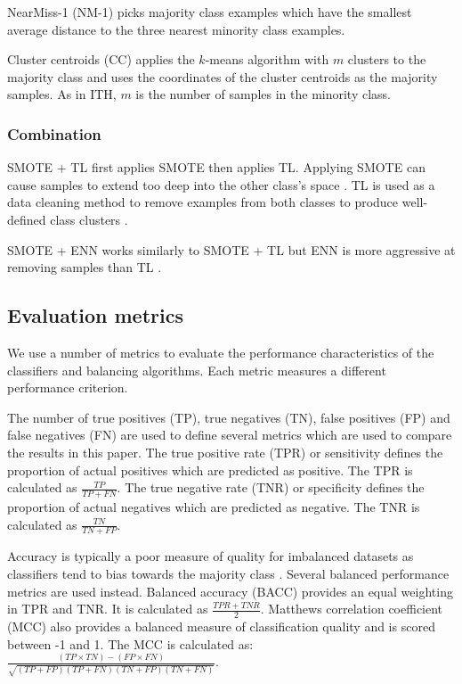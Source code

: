 \documentclass{sig-alternate-05-2015}
\begin{document}
	NearMiss-1 (NM-1) \cite{mani2003knn} picks majority class examples which have the smallest average distance to the three nearest minority class examples.
	
	Cluster centroids (CC) applies the $k$-means algorithm with $m$ clusters to the majority class and uses the coordinates of the cluster centroids as the majority samples. As in ITH, $m$ is the number of samples in the minority class.	
	
	\subsubsection{Combination}
	SMOTE + TL \cite{batista2003balancing} first applies SMOTE then applies TL. Applying SMOTE can cause samples to extend too deep into the other class's space \cite{batista2003balancing}. TL is used as a data cleaning method to remove examples from both classes to produce well-defined class clusters \cite{batista2003balancing}.
	
	SMOTE + ENN works similarly to SMOTE + TL but ENN is more aggressive at removing samples than TL \cite{Batista:2004:SBS:1007730.1007735}.
	
	\subsection{Evaluation metrics}
	We use a number of metrics to evaluate the performance characteristics of the classifiers and balancing algorithms. Each metric measures a different performance criterion.
	
	The number of true positives (TP), true negatives (TN), false positives (FP) and false negatives (FN) are used to define several metrics which are used to compare the results in this paper. The true positive rate (TPR) or sensitivity defines the proportion of actual positives which are predicted as positive. The TPR is calculated as $\frac{TP}{TP + FN}$. The true negative rate (TNR) or specificity defines the proportion of actual negatives which are predicted as negative. The TNR is calculated as $\frac{TN}{TN + FP}$. 
	
	Accuracy is typically a poor measure of quality for imbalanced datasets as classifiers tend to bias towards the majority class \cite{Batista:2004:SBS:1007730.1007735, Chawla:2004:ESI:1007730.1007733}. Several balanced performance metrics are used instead. Balanced accuracy (BACC) provides an equal weighting in TPR and TNR. It is calculated as $\frac{TPR + TNR}{2}$. Matthews correlation coefficient (MCC) also provides a balanced measure of classification quality and is scored between -1 and 1. The MCC is calculated as: $\frac{(TP \times TN) - (FP \times FN)}{\sqrt{(TP + FP)(TP + FN)(TN + FP)(TN + FN)}}$. 
	
\end{document}
